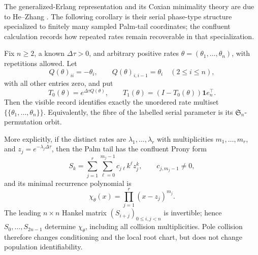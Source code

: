 The generalized-Erlang representation and its Coxian minimality theory are due
to He--Zhang \cite{HeZhang2009GeneralizedErlang,HeZhang2008MinimalCoxian}.
The following corollary is their serial phase-type structure specialized to
finitely many sampled Palm-tail coordinates; the confluent calculation records
how repeated rates remain recoverable in that specialization.

\begin{corollary}
\label{cor:nstate-serial-all-collision-identifiability-main}
Fix \(n\ge2\), a known \(\Delta\tau>0\), and arbitrary positive rates
\(\theta=(\theta_1,\ldots,\theta_n)\), with repetitions allowed. Let
\[
Q(\theta)_{ii}=-\theta_i,\qquad
Q(\theta)_{i,i-1}=\theta_i\quad(2\le i\le n),
\]
with all other entries zero, and put
\[
T_0(\theta)=e^{\Delta\tau Q(\theta)},\qquad
T_1(\theta)=(I-T_0(\theta))\mathbf1e_n^\top.
\]
Then the visible record identifies exactly the unordered rate multiset
\(\{\!\{\theta_1,\ldots,\theta_n\}\!\}\). Equivalently, the fibre of the
labelled serial parameter is its \(\mathfrak S_n\)-permutation orbit.

More explicitly, if the distinct rates are
\(\lambda_1,\ldots,\lambda_r\) with multiplicities
\(m_1,\ldots,m_r\), and \(z_j=e^{-\lambda_j\Delta\tau}\), then the Palm tail
has the confluent Prony form
\[
S_k=\sum_{j=1}^r\sum_{\ell=0}^{m_j-1}
c_{j\ell}k^\ell z_j^k,\qquad c_{j,m_j-1}\ne0,
\]
and its minimal recurrence polynomial is
\[
\chi_\theta(x)=\prod_{j=1}^r(x-z_j)^{m_j}.
\]
The leading \(n\times n\) Hankel matrix
\((S_{i+j})_{0\le i,j<n}\) is invertible; hence
\(S_0,\ldots,S_{2n-1}\) determine \(\chi_\theta\), including all collision
multiplicities. Pole collision therefore changes conditioning and the local
root chart, but does not change population identifiability.
\end{corollary}

